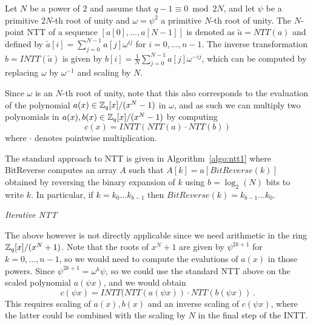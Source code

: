 Let $N$ be a power of $2$ and assume that $q-1 \equiv 0 \bmod 2N$, and let $\psi$ be a primitive $2N$-th root 
of unity and $\omega = \psi^2$ a primitive $N$-th root of unity.  The $N$-point NTT of a sequence 
$[a[0], \ldots, a[N-1]]$ is denoted as $\tilde{a} = NTT(a)$ and defined by $\tilde{a}[i] = \sum_{j = 0}^{N-1} a[j] \omega^{i j}$
for $i = 0, \ldots, n-1$.  The inverse transformation $b = INTT(\tilde{a})$ is given by 
$b[i] = \frac{1}{N} \sum_{j = 0}^{N-1} a[j] \omega^{-i j}$, which can be computed by replacing $\omega$ 
by $\omega^{-1}$ and scaling by $N$.

Since $\omega$ is an $N$-th root of unity, note that this also corresponds to the evaluation 
of the polynomial $a(x) \in \mathbb{Z}_q[x]/(x^N - 1)$ in $\omega$, and as such we can multiply two 
polynomials in $a(x), b(x) \in \mathbb{Z}_q[x]/(x^N - 1)$ by computing
\[  c(x) = INTT(NTT(a) \cdot NTT(b))  \]
where $\cdot$ denotes pointwise multiplication.

The standard approach to NTT is given in Algorithm~\ref{algo:ntt1} where BitReverse
computes an array $A$ such that $A[k] = a[BitReverse(k)]$ obtained by reversing
the binary expansion of $k$ using $b = \log_2(N)$ bits to write $k$.
In particular, if $k = k_0 \ldots k_{b-1}$ then $BitReverse(k) = k_{b-1} \ldots k_0$. 
\begin{algorithm}[!t] \label{algo:ntt1}
\begin{scriptsize}
\caption{\emph{Iterative NTT}}
\end{scriptsize}
\end{algorithm} 


The above however is not directly applicable since we need arithmetic in the ring $\mathbb{Z}_q[x]/(x^N+1)$.
Note that the roots of $x^N+1$ are given by $\psi^{2k + 1}$ for $k = 0, \ldots, n-1$, so we would 
need to compute the evalutions of $a(x)$ in those powers.  Since $\psi^{2k + 1} = \omega^k \psi$, 
so we could use the standard NTT above on the scaled polynomial $a(\psi x)$, and we would obtain
\[  c(\psi x) =    INTT(NTT(a(\psi x)) \cdot NTT(b(\psi x))   \, . \]
This requires scaling of $a(x), b(x)$ and an inverse scaling of $c(\psi x)$, where the latter could be 
combined with the scaling by $N$ in the final step of the INTT.

